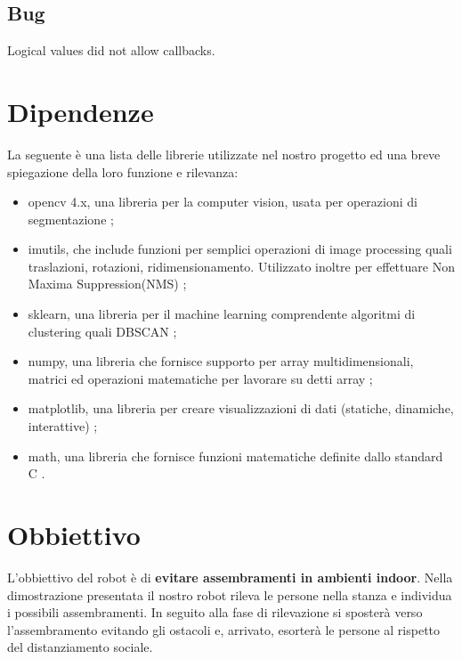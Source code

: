 \documentclass[a4paper]{article}
\begin{document}
	\subsection{Bug}\label{sec:Bug}
	Logical values did not allow callbacks.
	
	\section{Dipendenze}\label{sec:Dipendenze} 
	La seguente è una lista delle librerie utilizzate nel nostro progetto ed una breve spiegazione della loro funzione e rilevanza:
	
	\begin{itemize}
		\item opencv 4.x, una libreria per la computer vision, usata per operazioni di segmentazione \cite{opencv};
		\item imutils, che include funzioni per semplici operazioni di image processing quali traslazioni, rotazioni, ridimensionamento. Utilizzato inoltre per effettuare Non Maxima Suppression(NMS) \cite{imutils};
		\item sklearn, una libreria per il machine learning comprendente algoritmi di clustering quali DBSCAN \cite{scikit};
		\item numpy, una libreria che fornisce supporto per array multidimensionali, matrici ed operazioni matematiche per lavorare su detti array \cite{numpy};
		\item matplotlib, una libreria per creare visualizzazioni di dati (statiche, dinamiche, interattive) \cite{matplotlib};
		\item math, una libreria che fornisce funzioni matematiche definite dallo standard C \cite{math}.
	\end{itemize}

	\section{Obbiettivo}\label{sec:Obbiettivo} 
	L'obbiettivo del robot è di \textbf{evitare assembramenti in ambienti indoor}. \newline
	Nella dimostrazione presentata il nostro robot rileva le persone nella stanza e individua i possibili assembramenti. In seguito alla fase di rilevazione si sposterà verso l'assembramento evitando gli ostacoli e, arrivato, esorterà le persone al rispetto del distanziamento sociale.
	
\end{document}
